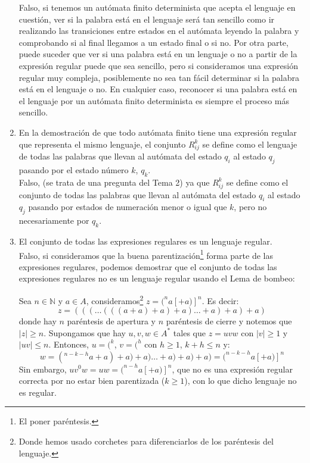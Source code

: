\begin{enumerate}
        Falso, si tenemos un autómata finito determinista que acepta el lenguaje en cuestión, ver si la palabra está en el lenguaje será tan sencillo como ir realizando las transiciones entre estados en el autómata leyendo la palabra y comprobando si al final llegamos a un estado final o si no. Por otra parte, puede suceder que ver si una palabra está en un lenguaje o no a partir de la expresión regular puede que sea sencillo, pero si consideramos una expresión regular muy compleja, posiblemente no sea tan fácil determinar si la palabra está en el lenguaje o no. En cualquier caso, reconocer si una palabra está en el lenguaje por un autómata finito determinista es siempre el proceso más sencillo.
    \item En la demostración de que todo autómata finito tiene una expresión regular que representa el mismo lenguaje, el conjunto $R^k_{ij}$ se define como el lenguaje de todas las palabras que llevan al autómata del estado $q_i$ al estado $q_j$ pasando por el estado número $k$, $q_k$.\\

        Falso, (se trata de una pregunta del Tema 2) ya que $R^k_{ij}$ se define como el conjunto de todas las palabras que llevan al autómata del estado $q_i$ al estado $q_j$ pasando por estados de numeración menor o igual que $k$, pero no necesariamente por $q_k$.
    \item El conjunto de todas las expresiones regulares es un lenguaje regular.\\

        Falso, si consideramos que la buena parentización\footnote{El poner paréntesis.} forma parte de las expresiones regulares, podemos demostrar que el conjunto de todas las expresiones regulares no es un lenguaje regular usando el Lema de bombeo:

        Sea $n\in \mathbb{N}$ y $a\in A$, consideramos\footnote{Donde hemos usado corchetes para diferenciarlos de los paréntesis del lenguaje.} $z = (^n a [+ a)]^n$. Es decir:
        \begin{equation*}
            z = (((\ldots(((a+a)+a)+a)\ldots +a) +a) +a)
        \end{equation*}
        donde hay $n$ paréntesis de apertura y $n$ paréntesis de cierre y notemos que $|z|\geq n$. Supongamos que hay $u,v,w \in A^\ast$ tales que $z = uvw$ con $|v|\geq 1$ y $|uv|\leq n$. Entonces, $u = (^k$, $v = (^h$ con $h\geq 1$, $k+h\leq n$ y:
        \begin{equation*}
            w = (^{n-k-h}a+a)+a)+a)\ldots +a) +a) +a) = (^{n-k-h}a[+a)]^n
        \end{equation*}
        Sin embargo, $uv^0w = uw = (^{n-h}a[+a)]^n$, que no es una expresión regular correcta por no estar bien parentizada ($k\geq 1$), con lo que dicho lenguaje no es regular.


\end{enumerate}
